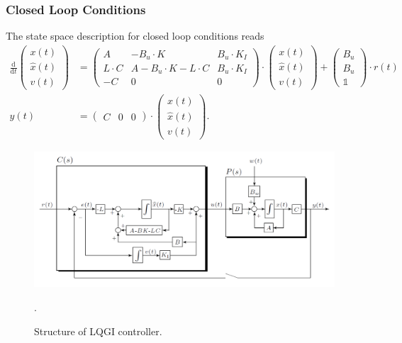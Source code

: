 \documentclass[a4paper,12 pt]{article}
\numberwithin{equation}{section}
\theoremstyle{definition}
\theoremstyle{remark}
\theoremstyle{definition}
\theoremstyle{definition}
\theoremstyle{definition}
\theoremstyle{remark}
\begin{document}
\subsubsection*{Closed Loop Conditions}
The state space description for closed loop conditions reads
\begin{equation}
\begin{split}
\frac{\text{d}}{\text{d}t}\begin{pmatrix}
x(t)\\
\hat{x}(t)\\
v(t)
\end{pmatrix}&=\begin{pmatrix}
A & -B_u\cdot K & B_u\cdot K_I\\
L\cdot C&A-B_u\cdot K-L\cdot C & B_u\cdot K_I\\
-C&0&0
\end{pmatrix}\cdot 
\begin{pmatrix}
x(t)\\
\hat{x}(t)\\
v(t)
\end{pmatrix} +\begin{pmatrix}
B_u\\ B_u \\ \mathbb{1}
\end{pmatrix}\cdot r(t)\\
y(t)&=\begin{pmatrix} C & 0 &0 \end{pmatrix} \cdot \begin{pmatrix}
x(t)\\
\hat{x}(t)\\
v(t)
\end{pmatrix}.
\end{split}
\end{equation}

\begin{figure}[h]
\centering
\includegraphics[width=\columnwidth]{lqgi}
\caption{Structure of LQGI controller.}
\label{fig:lqgi}.
\end{figure}
\newpage
\end{document}
